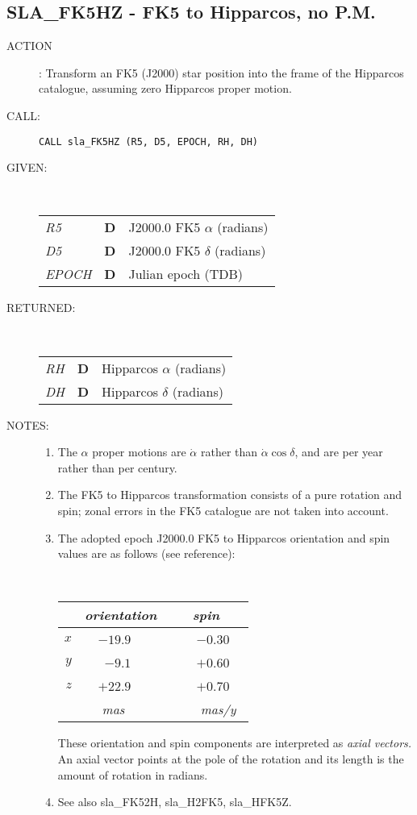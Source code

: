 \documentclass[11pt,twoside]{article}
\newcommand{\xlabel}[1]{}
\newcommand{\routine}[3]
{\hbadness=10000
  \vbox
  {
    \rule{\textwidth}{0.3mm}\\
    {\Large {\bf #1} \hfill #2 \hfill {\bf #1}}\\
    \setlength{\oldspacing}{\topsep}
    \setlength{\topsep}{0.3ex}
    \begin{description}
      #3
    \end{description}
    \setlength{\topsep}{\oldspacing}
  }
}
\renewcommand{\routine}[3]
   {
      \subsection{#1\xlabel{#1} - #2\label{#1}}
       \begin{description}
         #3
       \end{description}
   }
\newcommand{\action}[1]
{\item[ACTION]: #1}
\newcommand{\action}[1]
   {\item[ACTION:] #1}
\newcommand{\call}[1]
{\item[CALL]: \hspace{0.4em}{\tt #1}}
\newlength{\oldspacing}
\renewcommand{\call}[1]
   {
    \item[CALL:] {\tt #1}
   }
\newcommand{\args}[2]
{
  \goodbreak
  \setlength{\oldspacing}{\topsep}
  \setlength{\topsep}{0.3ex}
  \begin{description}
  \item[#1]:\\[1.5ex]
    \begin{tabular}{p{7em}p{6em}p{22em}}
      #2
    \end{tabular}
  \end{description}
  \setlength{\topsep}{\oldspacing}
}
\renewcommand{\args}[2]
   {
     \begin{description}
        \item[#1:]\\
        \begin{tabular}{p{7em}p{6em}l}
           #2
        \end{tabular}
     \end{description}
   }
\newcommand{\spec}[3]
{
  {\em {#1}} & {\bf \mbox{#2}} & {#3}
}
\newcommand{\notes}[1]
{
  \goodbreak
  \setlength{\oldspacing}{\topsep}
  \setlength{\topsep}{0.3ex}
  \begin{description}
    \item[NOTES]:
        #1
  \end{description}
  \setlength{\topsep}{\oldspacing}
}
\renewcommand{\notes}[1]
   {
      \begin{description}
         \item[NOTES:]
            #1
      \end{description}
   }
\begin{document}
\routine{SLA\_FK5HZ}{FK5 to Hipparcos, no P.M.}
{
 \action{Transform an FK5 (J2000) star position into the frame of the
         Hipparcos catalogue, assuming zero Hipparcos proper motion.}
 \call{CALL sla\_FK5HZ (R5, D5, EPOCH, RH, DH)}
}
\args{GIVEN}
{
 \spec{R5}{D}{J2000.0 FK5 $\alpha$ (radians)} \\
 \spec{D5}{D}{J2000.0 FK5 $\delta$ (radians)} \\
 \spec{EPOCH}{D}{Julian epoch (TDB)}
}
\args{RETURNED}
{
 \spec{RH}{D}{Hipparcos $\alpha$ (radians)} \\
 \spec{DH}{D}{Hipparcos $\delta$ (radians)}
}
\notes
{
 \begin{enumerate}
  \item The $\alpha$ proper motions are $\dot{\alpha}$ rather than
        $\dot{\alpha}\cos\delta$, and are per year rather than per century.
  \item The FK5 to Hipparcos
        transformation consists of a pure rotation and spin;
        zonal errors in the FK5 catalogue are not taken into account.
  \item The adopted epoch J2000.0 FK5 to Hipparcos orientation and spin
        values are as follows (see reference):

        \vspace{2ex}

        ~~~~~~~~~~~~
        \begin{tabular}{|r|r|r|} \hline
        &
        \multicolumn{1}{|c}{\it orientation} &
        \multicolumn{1}{|c|}{\it ~~~spin~~~} \\ \hline
        $x$ & $-19.9$~~~~ & ~$-0.30$~~ \\
        $y$ &  $-9.1$~~~~ & ~$+0.60$~~ \\
        $z$ & $+22.9$~~~~ & ~$+0.70$~~ \\ \hline
        & {\it mas}~~~~~ & ~{\it mas/y}~ \\ \hline
        \end{tabular}

        \vspace{3ex}

        These orientation and spin components are interpreted as
        {\it axial vectors.}  An axial vector points at the pole of
        the rotation and its length is the amount of rotation in radians.
  \item See also sla\_FK52H, sla\_H2FK5, sla\_HFK5Z.
 \end{enumerate}
}
\end{document}
